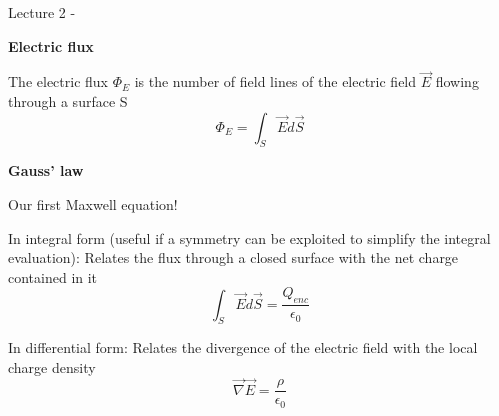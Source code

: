 \renewcommand{\summarizedlecture}{2 }


%
%
%

\begin{frame}{Lecture \summarizedlecture - \lecturesummarytitle}

\begin{itemize}
{\small

\item {\bf Electric flux}
  \begin{itemize}
  {\small
     \item The electric flux $\Phi_E$ is the number of field lines of the electric field $\vec{E}$
           flowing through a surface S
        \begin{equation*}
          \Phi_E = \int_{S} \vec{E} d\vec{S}
        \end{equation*}
  }
  \end{itemize}

\item {\bf Gauss' law}
  \begin{itemize}
  {\small
     \item Our first Maxwell equation!
     \item In integral form (useful if a symmetry can be exploited to simplify the integral evaluation):
           Relates the flux through a closed surface with the net charge contained in it
           \begin{equation*}
              \int_{S} \vec{E} d\vec{S} = \frac{Q_{enc}}{\epsilon_0}
           \end{equation*}
     \item In differential form:
           Relates the divergence of the electric field with the local charge density
           \begin{equation*}
              \vec{\nabla} \vec{E} = \frac{\rho}{\epsilon_0}
           \end{equation*}
  }
  \end{itemize}

}
\end{itemize}

\end{frame}
